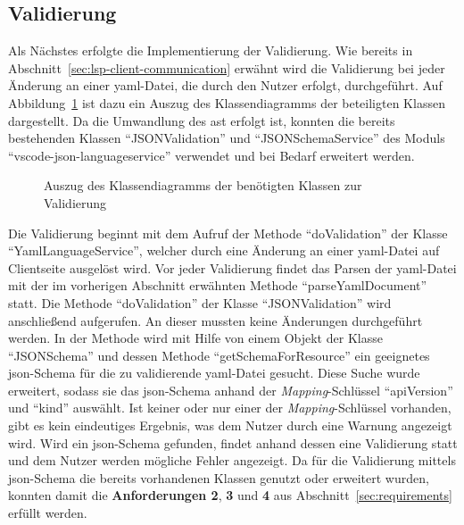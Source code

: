 \subsection{Validierung}

Als Nächstes erfolgte die Implementierung der Validierung. Wie bereits in Abschnitt~\ref{sec:lsp-client-communication} erwähnt wird die
Validierung bei jeder Änderung an einer \ac{yaml}-Datei, die durch den Nutzer erfolgt, durchgeführt.
Auf Abbildung~\ref{fig:class-diagram-yaml-language-service-validation} ist dazu ein Auszug des Klassendiagramms der beteiligten Klassen dargestellt.
Da die Umwandlung des \ac{ast} erfolgt ist, konnten die bereits bestehenden Klassen ``JSONValidation'' und ``JSONSchemaService''
des Moduls ``vscode-json-languageservice'' verwendet und bei Bedarf erweitert werden.

\begin{figure}[t] %
      \centering
      \caption{Auszug des Klassendiagramms der benötigten Klassen zur Validierung}
      \label{fig:class-diagram-yaml-language-service-validation}
\end{figure}

Die Validierung beginnt mit dem Aufruf der Methode ``doValidation'' der Klasse ``YamlLanguageService'', welcher
durch eine Änderung an einer \ac{yaml}-Datei auf Clientseite ausgelöst wird.
Vor jeder Validierung findet das Parsen der \ac{yaml}-Datei mit der im vorherigen Abschnitt erwähnten Methode ``parseYamlDocument'' statt.
Die Methode ``doValidation'' der Klasse ``JSONValidation'' wird anschließend aufgerufen. An dieser mussten keine Änderungen durchgeführt werden.
In der Methode wird mit Hilfe von einem Objekt der Klasse ``JSONSchema'' und dessen Methode ``getSchemaForResource'' ein geeignetes \ac{json}-Schema
für die zu validierende \ac{yaml}-Datei gesucht. Diese Suche wurde erweitert, sodass sie das \ac{json}-Schema anhand
der \textit{Mapping}-Schlüssel ``apiVersion'' und ``kind'' auswählt.
Ist keiner oder nur einer der \textit{Mapping}-Schlüssel vorhanden, gibt es kein eindeutiges Ergebnis, was dem Nutzer durch eine Warnung angezeigt wird.
Wird ein \ac{json}-Schema gefunden, findet anhand dessen eine Validierung statt und dem Nutzer werden mögliche Fehler angezeigt.
Da für die Validierung mittels \ac{json}-Schema die bereits vorhandenen Klassen genutzt oder erweitert wurden,
konnten damit die \textbf{Anforderungen 2}, \textbf{3} und \textbf{4} aus Abschnitt~\ref{sec:requirements} erfüllt werden.

